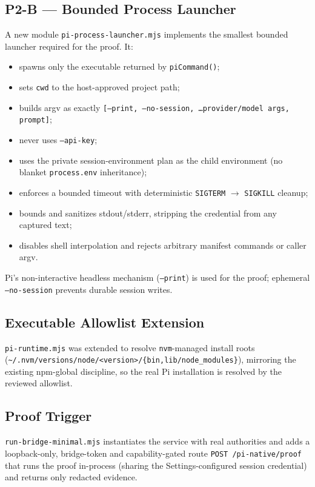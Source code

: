 \documentclass[11pt]{article}
\newcommand{\code}[1]{\texttt{#1}}
\begin{document}
\subsection{P2-B --- Bounded Process Launcher}

A new module \code{pi-process-launcher.mjs} implements the smallest bounded
launcher required for the proof. It:

\begin{itemize}
  \item spawns only the executable returned by \code{piCommand()};
  \item sets \code{cwd} to the host-approved project path;
  \item builds argv as exactly
    \code{[--print, --no-session, \ldots{}provider/model args, prompt]};
  \item never uses \code{--api-key};
  \item uses the private session-environment plan as the child environment
    (no blanket \code{process.env} inheritance);
  \item enforces a bounded timeout with deterministic \code{SIGTERM}
    $\rightarrow$ \code{SIGKILL} cleanup;
  \item bounds and sanitizes stdout/stderr, stripping the credential from any
    captured text;
  \item disables shell interpolation and rejects arbitrary manifest commands or
    caller argv.
\end{itemize}

Pi's non-interactive headless mechanism (\code{--print}) is used for the proof;
ephemeral \code{--no-session} prevents durable session writes.

\subsection{Executable Allowlist Extension}

\code{pi-runtime.mjs} was extended to resolve \code{nvm}-managed install roots
(\code{\textasciitilde/.nvm/versions/node/<version>/\{bin,lib/node\_modules\}}),
mirroring the existing npm-global discipline, so the real Pi installation is
resolved by the reviewed allowlist.

\subsection{Proof Trigger}

\code{run-bridge-minimal.mjs} instantiates the service with real authorities and
adds a loopback-only, bridge-token and capability-gated route
\code{POST /pi-native/proof} that runs the proof in-process (sharing the
Settings-configured session credential) and returns only redacted evidence.
\end{document}
